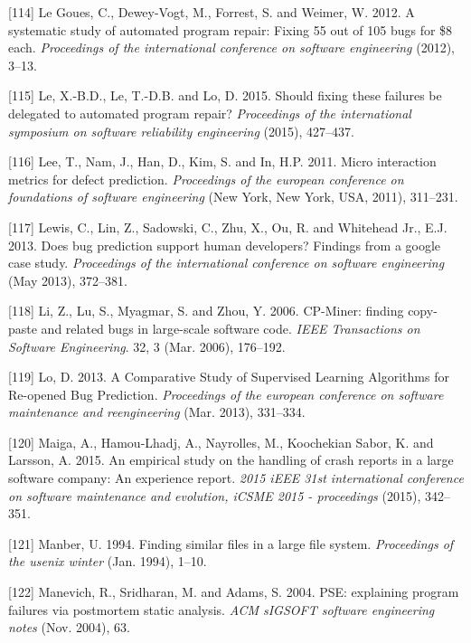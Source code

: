 \documentclass[12pt]{report}
\begin{document}
\hypertarget{ref-le2012systematic}{}
{[}114{]} Le Goues, C., Dewey-Vogt, M., Forrest, S. and Weimer, W. 2012.
A systematic study of automated program repair: Fixing 55 out of 105
bugs for \$8 each. \emph{Proceedings of the international conference on
software engineering} (2012), 3--13.

\hypertarget{ref-le2015should}{}
{[}115{]} Le, X.-B.D., Le, T.-D.B. and Lo, D. 2015. Should fixing these
failures be delegated to automated program repair? \emph{Proceedings of
the international symposium on software reliability engineering} (2015),
427--437.

\hypertarget{ref-Lee2011a}{}
{[}116{]} Lee, T., Nam, J., Han, D., Kim, S. and In, H.P. 2011. Micro
interaction metrics for defect prediction. \emph{Proceedings of the
european conference on foundations of software engineering} (New York,
New York, USA, 2011), 311--231.

\hypertarget{ref-Lewis2013}{}
{[}117{]} Lewis, C., Lin, Z., Sadowski, C., Zhu, X., Ou, R. and
Whitehead Jr., E.J. 2013. Does bug prediction support human developers?
Findings from a google case study. \emph{Proceedings of the
international conference on software engineering} (May 2013), 372--381.

\hypertarget{ref-Li2006}{}
{[}118{]} Li, Z., Lu, S., Myagmar, S. and Zhou, Y. 2006. CP-Miner:
finding copy-paste and related bugs in large-scale software code.
\emph{IEEE Transactions on Software Engineering}. 32, 3 (Mar. 2006),
176--192.

\hypertarget{ref-Lo2013}{}
{[}119{]} Lo, D. 2013. A Comparative Study of Supervised Learning
Algorithms for Re-opened Bug Prediction. \emph{Proceedings of the
european conference on software maintenance and reengineering} (Mar.
2013), 331--334.

\hypertarget{ref-Maiga2015}{}
{[}120{]} Maiga, A., Hamou-Lhadj, A., Nayrolles, M., Koochekian Sabor,
K. and Larsson, A. 2015. An empirical study on the handling of crash
reports in a large software company: An experience report. \emph{2015
iEEE 31st international conference on software maintenance and
evolution, iCSME 2015 - proceedings} (2015), 342--351.

\hypertarget{ref-Manber1994}{}
{[}121{]} Manber, U. 1994. Finding similar files in a large file system.
\emph{Proceedings of the usenix winter} (Jan. 1994), 1--10.

\hypertarget{ref-Manevich2004}{}
{[}122{]} Manevich, R., Sridharan, M. and Adams, S. 2004. PSE:
explaining program failures via postmortem static analysis. \emph{ACM
sIGSOFT software engineering notes} (Nov. 2004), 63.
\end{document}
